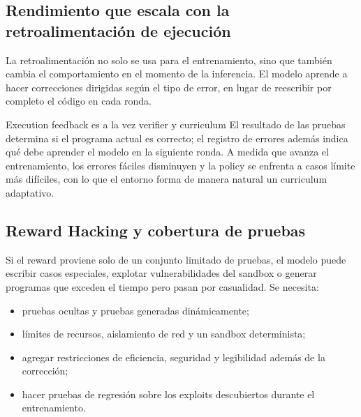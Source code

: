 \documentclass[a4paper]{article}
\begin{document}
\subsection{Rendimiento que escala con la retroalimentación de ejecución}


La retroalimentación no solo se usa para el entrenamiento, sino que también cambia el comportamiento en el momento de la inferencia. El modelo aprende a hacer correcciones dirigidas según el tipo de error, en lugar de reescribir por completo el código en cada ronda.



\begin{importantbox}{Execution feedback es a la vez verifier y curriculum}
El resultado de las pruebas determina si el programa actual es correcto; el registro de errores además indica qué debe aprender el modelo en la siguiente ronda. A medida que avanza el entrenamiento, los errores fáciles disminuyen y la policy se enfrenta a casos límite más difíciles, con lo que el entorno forma de manera natural un curriculum adaptativo.
\end{importantbox}

\subsection{Reward Hacking y cobertura de pruebas}

Si el reward proviene solo de un conjunto limitado de pruebas, el modelo puede escribir casos especiales, explotar vulnerabilidades del sandbox o generar programas que exceden el tiempo pero pasan por casualidad. Se necesita:

\begin{itemize}
    \item pruebas ocultas y pruebas generadas dinámicamente;
    \item límites de recursos, aislamiento de red y un sandbox determinista;
    \item agregar restricciones de eficiencia, seguridad y legibilidad además de la corrección;
    \item hacer pruebas de regresión sobre los exploits descubiertos durante el entrenamiento.
\end{itemize}
\end{document}
